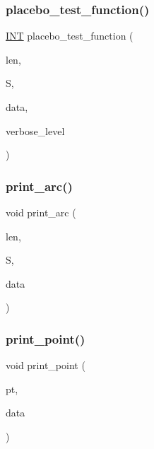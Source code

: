 \mbox{\label{arc__generator_8_c_a8bc0fcb8c8ce7d1392279a4423c9d0a2}} 
\subsubsection{\texorpdfstring{placebo\+\_\+test\+\_\+function()}{placebo\_test\_function()}}
{\footnotesize\ttfamily \mbox{\hyperlink{galois_8h_a09fddde158a3a20bd2dcadb609de11dc}{I\+NT}} placebo\+\_\+test\+\_\+function (\begin{DoxyParamCaption}\item[{\mbox{\hyperlink{galois_8h_a09fddde158a3a20bd2dcadb609de11dc}{I\+NT}}}]{len,  }\item[{\mbox{\hyperlink{galois_8h_a09fddde158a3a20bd2dcadb609de11dc}{I\+NT}} $\ast$}]{S,  }\item[{void $\ast$}]{data,  }\item[{\mbox{\hyperlink{galois_8h_a09fddde158a3a20bd2dcadb609de11dc}{I\+NT}}}]{verbose\+\_\+level }\end{DoxyParamCaption})}

\mbox{\label{arc__generator_8_c_a2d0267ec166d32b91a35af1d1e66427f}} 
\subsubsection{\texorpdfstring{print\+\_\+arc()}{print\_arc()}}
{\footnotesize\ttfamily void print\+\_\+arc (\begin{DoxyParamCaption}\item[{\mbox{\hyperlink{galois_8h_a09fddde158a3a20bd2dcadb609de11dc}{I\+NT}}}]{len,  }\item[{\mbox{\hyperlink{galois_8h_a09fddde158a3a20bd2dcadb609de11dc}{I\+NT}} $\ast$}]{S,  }\item[{void $\ast$}]{data }\end{DoxyParamCaption})}

\mbox{\label{arc__generator_8_c_a2bde441010b814b154aea558c1272280}} 
\subsubsection{\texorpdfstring{print\+\_\+point()}{print\_point()}}
{\footnotesize\ttfamily void print\+\_\+point (\begin{DoxyParamCaption}\item[{\mbox{\hyperlink{galois_8h_a09fddde158a3a20bd2dcadb609de11dc}{I\+NT}}}]{pt,  }\item[{void $\ast$}]{data }\end{DoxyParamCaption})}

